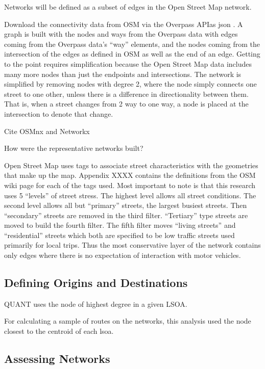 Networks will be defined as a subset of edges in the Open Street Map network. 

Download the connectivity data from OSM via the Overpass APIas json . A graph is built with the nodes and ways from the Overpass data with edges coming from the Overpass data's ``way'' elements, and the nodes coming from the intersection of the edges as defined in OSM as well as the end of an edge. Getting to the point requires simplification because the Open Street Map data includes many more nodes than just the endpoints and intersections. The network is simplified by removing nodes with degree 2, where the node simply connects one street to one other, unless there is a difference in directionality between them. That is, when a street changes from 2 way to one way, a node is placed at the intersection to denote that change. 

Cite OSMnx \cite{osmnx} and Networkx \cite{networkx}

How were the representative networks built? 

Open Street Map uses tags to associate street characteristics with the geometries that make up the map. Appendix XXXX contains the definitions from the OSM wiki page for each of the tags used. Most important to note is that this research uses 5 ``levels'' of street stress. The highest level allows all street conditions. The second level allows all but ``primary'' streets, the largest busiest streets. Then ``secondary'' streets are removed in the third filter. ``Tertiary'' type streets are moved to build the fourth filter. The fifth filter moves ``living streets'' and ``residential'' streets which both are specified to be low traffic streets used primarily for local trips. Thus the most conservative layer of the network contains only edges where there is no expectation of interaction with motor vehicles. 

\subsection{Defining Origins and Destinations}

QUANT uses the node of highest degree in a given LSOA. 

For calculating a sample of routes on the networks, this analysis used the node closest to the centroid of each lsoa. 

\subsection{Assessing Networks}

